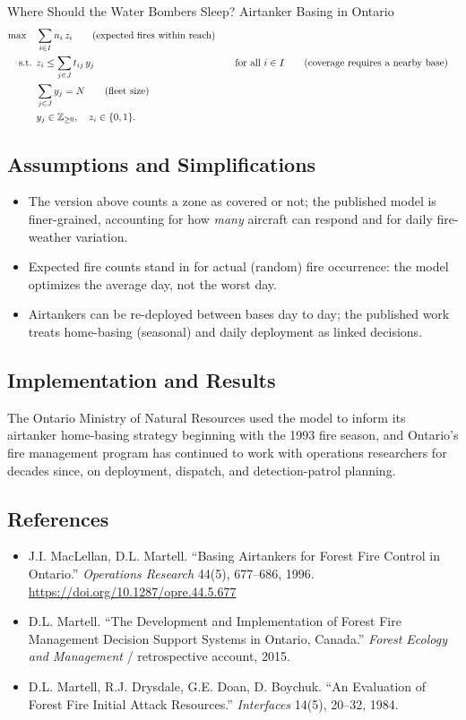 \begin{casestudybox}{Where Should the Water Bombers Sleep? Airtanker Basing in Ontario}
\begin{align*}
\max \quad & \sum_{i \in I} n_i \, z_i   \tag{expected fires within reach} \\
\mbox{ s.t. }        & z_i \leq \sum_{j \in J} t_{ij}\, y_j &&\quad \mbox{for all } i \in I   \tag{coverage requires a nearby base} \\
             & \sum_{j \in J} y_j = N   \tag{fleet size} \\
             & y_j \in \mathbb{Z}_{\geq 0}, \quad z_i \in \{0,1\}.
\end{align*}

\subsection*{Assumptions and Simplifications}
\begin{itemize}
\item The version above counts a zone as covered or not; the published model is finer-grained, accounting for how \emph{many} aircraft can respond and for daily fire-weather variation.
\item Expected fire counts stand in for actual (random) fire occurrence: the model optimizes the average day, not the worst day.
\item Airtankers can be re-deployed between bases day to day; the published work treats home-basing (seasonal) and daily deployment as linked decisions.
\end{itemize}

\subsection*{Implementation and Results}
The Ontario Ministry of Natural Resources used the model to inform its airtanker home-basing strategy beginning with the 1993 fire season, and Ontario's fire management program has continued to work with operations researchers for decades since, on deployment, dispatch, and detection-patrol planning.

\subsection*{References}
\begin{itemize}
\item J.I. MacLellan, D.L. Martell. ``Basing Airtankers for Forest Fire Control in Ontario.'' \emph{Operations Research} 44(5), 677--686, 1996. \url{https://doi.org/10.1287/opre.44.5.677}
\item D.L. Martell. ``The Development and Implementation of Forest Fire Management Decision Support Systems in Ontario, Canada.'' \emph{Forest Ecology and Management} / retrospective account, 2015.
\item D.L. Martell, R.J. Drysdale, G.E. Doan, D. Boychuk. ``An Evaluation of Forest Fire Initial Attack Resources.'' \emph{Interfaces} 14(5), 20--32, 1984.
\end{itemize}
\end{casestudybox}


